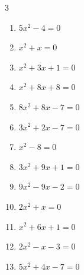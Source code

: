 \begin{multicols}{3}
\begin{enumerate}
  \item $5x^{2}-4=0$


  \item $x^{2}+x=0$

        \phantom{$\displaystyle x=0, \; -1$}

\columnbreak %

  \item $x^{2}+3x+1=0$


  \item $x^{2}+8x+8=0$


  \item $8x^{2}+8x-7=0$


  \item $3x^{2}+2x-7=0$


  \item $x^{2}-8=0$


  \item $3x^{2}+9x+1=0$


  \item $9x^{2}-9x-2=0$


\columnbreak %

  \item $2x^{2}+x=0$


  \item $x^{2}+6x+1=0$


  \item $2x^{2}-x-3=0$


  \item $5x^{2}+4x-7=0$


\end{enumerate}
\end{multicols}
